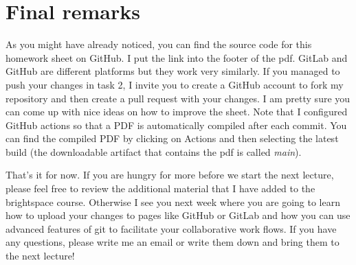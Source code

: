 \documentclass[12pt]{article}
\begin{document}
\section{Final remarks}
As you might have already noticed, you can find the source code for this homework sheet on GitHub.
I put the link into the footer of the pdf.
GitLab and GitHub are different platforms but they work very similarly.
If you managed to push your changes in task 2, I invite you to create a GitHub account
to fork my repository and then create a pull request with your changes.
I am pretty sure you can come up with nice ideas on how to improve the sheet.
Note that I configured GitHub actions so that a PDF is automatically compiled after each commit.
You can find the compiled PDF by clicking on Actions and then selecting the latest build (the downloadable artifact that contains the pdf is called \textit{main}).

That's it for now. If you are hungry for more before we start the next lecture, please
feel free to review the additional material that I have added to the brightspace course.
Otherwise I see you next week where you are going to learn how to upload your changes
to pages like GitHub or GitLab and how you can use advanced features of git to facilitate your
collaborative work flows. If you have any questions,
please write me an email or write them down and bring them to the next lecture!
\end{document}
